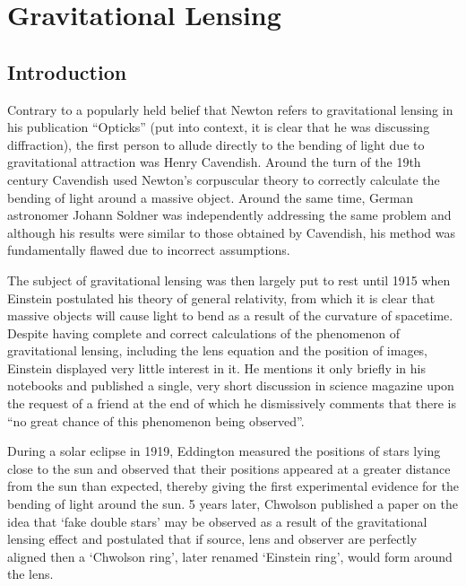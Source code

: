 
\section{Gravitational Lensing} %
\label{sec:gravitational_lensing}

    \subsection{Introduction} %
    \label{sub:introduction}
        Contrary to a popularly held belief that Newton refers to gravitational lensing in his publication ``Opticks''\cite{Newton_Opticks} (put into context, it is clear that he was discussing diffraction), the first person to allude directly to the bending of light due to gravitational attraction was Henry Cavendish. Around the turn of the 19th century Cavendish used Newton’s corpuscular theory to correctly calculate the bending of light around a massive object.  Around the same time, German astronomer Johann Soldner was independently addressing the same problem\cite{Soldner} and although his results were similar to those obtained by Cavendish, his method was fundamentally flawed due to incorrect assumptions\cite{Conceptual_origins_of_GL}. 

        The subject of gravitational lensing was then largely put to rest until 1915 when Einstein postulated his theory of general relativity, from which it is clear that massive objects will cause light to bend as a result of the curvature of spacetime. Despite having complete and correct calculations of the phenomenon of gravitational lensing, including the lens equation and the position of images, Einstein displayed very little interest in it. He mentions it only briefly in his notebooks and published a single, very short discussion in science magazine upon the request of a friend at the end of which he dismissively comments that there is “no great chance of this phenomenon being observed”\cite{Einstein_science_magazine}. 

        During a solar eclipse in 1919, Eddington measured the positions of stars lying close to the sun and observed that their positions appeared at a greater distance from the sun than expected, thereby giving the first experimental evidence for the bending of light around the sun\cite{Eddington_GL_evidence}. 5 years later, Chwolson published a paper on the idea that `fake double stars' may be observed as a result of the gravitational lensing effect and postulated that if source, lens and observer are perfectly aligned then a `Chwolson ring', later renamed `Einstein ring', would form around the lens\cite{Conceptual_origins_of_GL}. 

